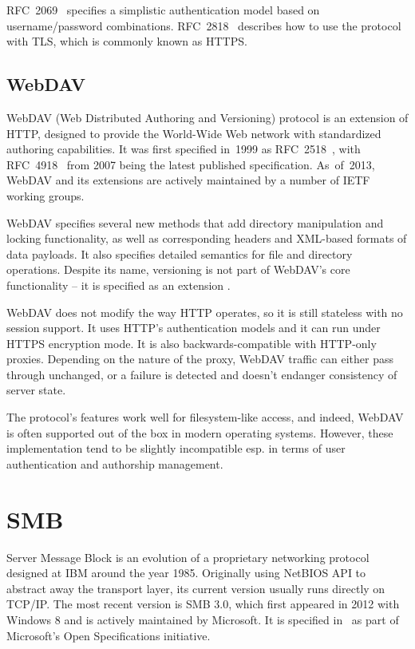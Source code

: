 RFC~2069~\cite{rfc2069} specifies a simplistic authentication model based on username/password combinations.
RFC~2818~\cite{rfc2818} describes how to use the protocol with TLS, which is commonly known as HTTPS.

\subsection{WebDAV}

WebDAV (Web Distributed Authoring and Versioning) protocol is an extension of HTTP, designed to provide the
World-Wide Web network with standardized authoring capabilities. It was first specified in~1999 as
RFC~2518~\cite{rfc2518}, with RFC~4918~\cite{rfc4918} from 2007 being the latest published specification.
As~of~2013, WebDAV and its extensions are actively maintained by a number of IETF working groups.

WebDAV specifies several new methods that add directory manipulation and locking functionality, as well as
corresponding headers and XML-based formats of data payloads. It also specifies detailed semantics for file
and directory operations. Despite its name, versioning is not part of WebDAV's core functionality -- it is
specified as an extension \cite{rfc3253}.

WebDAV does not modify the way HTTP operates, so it is still stateless with no session support. It uses HTTP's
authentication models and it can run under HTTPS encryption mode. It is also backwards-compatible with
HTTP-only proxies. Depending on the nature of the proxy, WebDAV traffic can either pass through unchanged, or
a failure is detected and doesn't endanger consistency of server state.

The protocol's features work well for filesystem-like access, and indeed, WebDAV is often supported out of the
box in modern operating systems. However, these implementation tend to be slightly incompatible esp. in terms
of user authentication and authorship management.

\section{SMB}

Server Message Block is an evolution of a proprietary networking protocol designed at IBM around the year
1985. Originally using NetBIOS API to abstract away the transport layer, its current version usually runs
directly on TCP/IP.  The most recent version is SMB 3.0, which first appeared in 2012 with Windows 8 and is
actively maintained by Microsoft. It is specified in~\cite{mssmb2} as part of Microsoft's Open Specifications
initiative.

